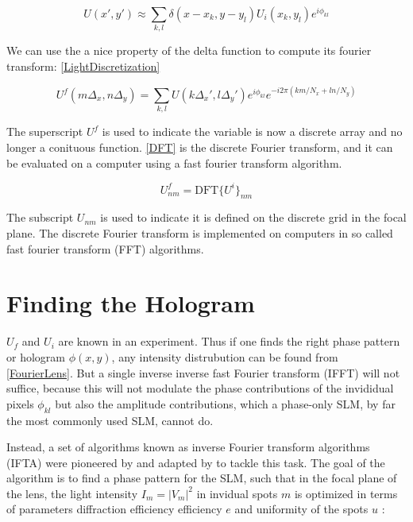 \begin{equation}\label{LightDiscretization}
    U(x',y') \approx \sum_{k,l} \delta(x-x_k, y-y_l)  U_i(x_k,y_l) e^{i \phi_{kl}}
\end{equation}

We can use the a nice property of the delta function to compute its fourier transform: \cref{LightDiscretization} 

\begin{equation}\label{DFT}
    U^f(m \Delta_x, n \Delta_y) = \sum_{k,l} U(k \Delta_x',l \Delta_y') e^{i \phi_{kl}} e^{-i 2\pi (km/N_x+ln/N_y)}
\end{equation}

The superscript $U^f$ is used to indicate the variable is now a discrete array and no longer a conituous function. \cref{DFT} is the discrete Fourier transform, and it can be evaluated on a computer using a fast fourier transform algorithm. 

\begin{equation}\label{DFTshort}
    U^f_{nm} = \text{DFT}\{U^i\}_{nm}
\end{equation}

The subscript $U_{nm}$ is used to indicate it is defined on the discrete grid in the focal plane. The discrete Fourier transform is implemented on computers in so called fast fourier transform (FFT) algorithms. 

\section{Finding the Hologram}\label{sec:IFTA}

$U_f$ and $U_i$ are known in an experiment. Thus if one finds the right phase pattern or hologram $\phi(x,y)$, any intensity distrubution can be found from \cref{FourierLens}. But a single inverse inverse fast Fourier transform (IFFT) will not suffice, because this will not modulate the phase contributions of the invididual pixels $\phi_{kl}$ but also the amplitude contributions, which a phase-only SLM, by far the most commonly used SLM, cannot do. 

Instead, a set of algorithms known as inverse Fourier transform algorithms (IFTA) were pioneered by \cite{Hirsch1971} and adapted by \cite{Gerschberg1972} to tackle this task. The goal of the algorithm is to find a phase pattern for the SLM, such that in the focal plane of the lens, the light intensity $I_m = |V_m|^2$ in invidual spots $m$ is optimized in terms of parameters diffraction efficiency efficiency $e$ and uniformity of the spots $u$ \cite{DiLeonardo2007}:

